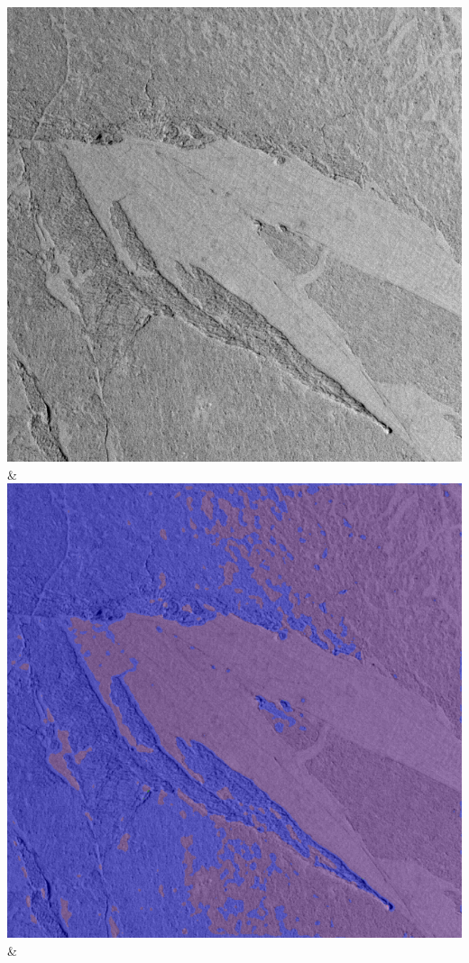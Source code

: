 \begin{table}[h!]
\begin{tabularx}{\textwidth}
		\includegraphics[width=0.9\linewidth]{images/p03/p03_03.png} &
		\includegraphics[width=0.9\linewidth]{images/gen/activation_functions/p03_03.png_None.png} &

\end{tabularx}
\end{table}
